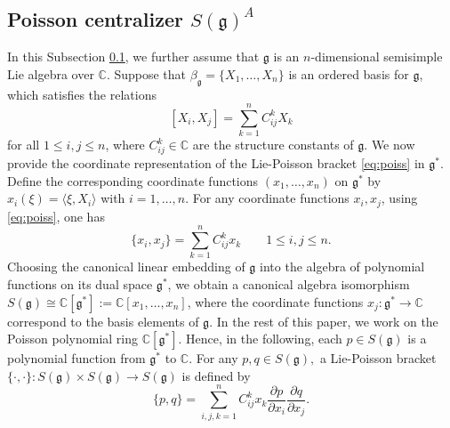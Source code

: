 \documentclass[11pt,reqno]{amsart}
\newtheorem*{theorem A}{Main Theorem A}
\newtheorem*{theorem B}{Main Theorem B}
\newtheorem*{theorem C}{Main Theorem C}
\newtheorem*{theorem D}{Main Theorem D}
\theoremstyle{definition}
\theoremstyle{plain}
\theoremstyle{conclusion}
\begin{document}
\subsection{Poisson centralizer \texorpdfstring{$S(\mathfrak{g})^A$}{S()^A}}
\label{subsec:poicentra}

In this Subsection \ref{subsec:poicentra}, we further assume that $\mathfrak{g}$ is an $n$-dimensional semisimple Lie algebra over $\mathbb{C}$. Suppose that $\beta_\mathfrak{g} = \{X_1,\ldots,X_n\}$ is an ordered basis for $\mathfrak{g}$, which satisfies the relations $$ [X_i,X_j] = \sum_{k=1}^n C_{ij}^k X_k $$ for all $ 1 \leq i,j \leq n $, where $C_{ij}^k \in \mathbb{C} $ are the structure constants of $\mathfrak{g}$.   We now provide the coordinate representation of the Lie-Poisson bracket \eqref{eq:poiss} in $\mathfrak{g}^*$. Define the corresponding coordinate functions $  (x_1,\ldots,x_n)$ on $\mathfrak{g}^*$ by $x_i(\xi) = \langle \xi,X_i\rangle$ with $i = 1,\ldots,n$. For any coordinate functions $x_i,x_j$, using \eqref{eq:poiss}, one has   \begin{equation}
\{x_i,x_j\}= \sum_{k=1}^n C_{ij}^k x_k \qquad 1 \leq i,j \leq n .
\end{equation} %
Choosing the canonical linear embedding of $\mathfrak{g}$ into the algebra of polynomial functions on its dual space $\mathfrak{g}^*$, we obtain a canonical algebra isomorphism  $S(\mathfrak{g}) \cong \mathbb{C}[\mathfrak{g}^*] := \mathbb{C}[x_1,\ldots,x_n]$, where the coordinate functions $ x_j:\mathfrak{g}^*\rightarrow\mathbb{C}$ correspond to the basis elements of $\mathfrak{g}$. In the rest of this paper, we work on the Poisson polynomial ring $\mathbb{C}[\mathfrak{g}^*]$.  Hence, in the following, each $p \in S(\mathfrak{g})$ is a polynomial function from $\mathfrak{g}^*$ to $\mathbb{C}$. For any $p,q \in S(\mathfrak{g}),$ a Lie-Poisson bracket $\{\cdot,\cdot\}:S(\mathfrak{g}) \times S(\mathfrak{g}) \rightarrow S(\mathfrak{g})$ is defined by \begin{equation}
\{p,q\}= \sum_{  i,j,k = 1}^n C_{ij}^k x_k \dfrac{\partial p }{\partial x_i }\dfrac{\partial q}{\partial x_j } .\label{eq:poi}
\end{equation} 
\end{document}
